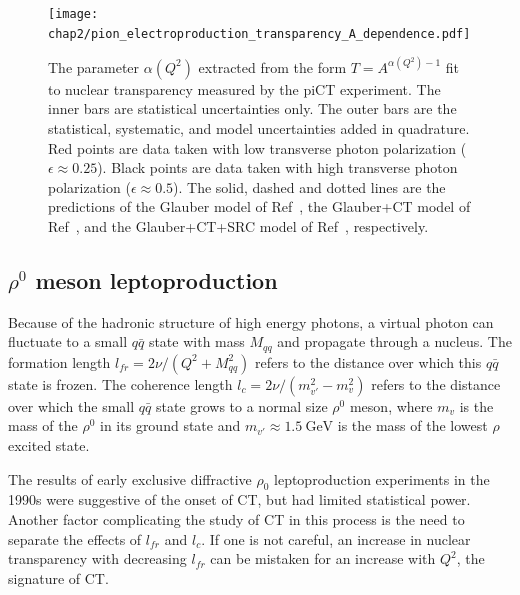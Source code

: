 \begin{figure}[!h]
    \centering
    \texttt{[image: chap2/pion\_electroproduction\_transparency\_A\_dependence.pdf]}
    \caption[The parameter $\alpha(Q^2)$ extracted from the form
            $T=A^{\alpha(Q^2)-1}$
            fit to nuclear transparency measured by the piCT experiment.]{
            The parameter $\alpha(Q^2)$ extracted from the form
            $T=A^{\alpha(Q^2)-1}$
            fit to nuclear transparency measured by the piCT experiment.
            The inner bars are statistical uncertainties only.
            The outer bars are the statistical, systematic, and model
            uncertainties added in quadrature.
            Red points are data taken with low transverse photon polarization
            ($\epsilon\approx0.25$).
            Black points are data taken with high transverse photon polarization
            ($\epsilon\approx0.5$).
            The solid, dashed and dotted lines are the predictions of
            the Glauber model of Ref~\cite{Larson_2006},
            the Glauber+CT model of Ref~\cite{Larson_2006},
            and the Glauber+CT+SRC model of Ref~\cite{Cosyn_2006},
            respectively.
            }
    \label{fig:pion_electroproduction_transparency_A_dependence}
\end{figure}

\subsection{$\rho^0$ meson leptoproduction}
Because of the hadronic structure of high energy photons,
a virtual photon can fluctuate to a small $q\bar{q}$ state with mass $M_{qq}$
and propagate through a nucleus.
The formation length $l_{fr}=2\nu/(Q^2+M^2_{qq})$ refers to the distance over
which this $q\bar{q}$ state is frozen.
The coherence length $l_c=2\nu/(m^2_{v'}-m^2_{v})$ refers to the distance over
which the small $q\bar{q}$ state grows to a normal size $\rho^0$ meson,
where $m_v$ is the mass of the $\rho^0$ in its ground state
and $m_{v'}\approx\SI{1.5}{\giga\electronvolt}$ is the mass of the lowest $\rho$
excited state.


The results of early exclusive diffractive $\rho_0$ leptoproduction
experiments in the 1990s were suggestive of the onset of CT, but had limited
statistical power.
Another factor complicating the study of CT in this process is the
need to separate the effects of $l_{fr}$ and $l_c$.
If one is not careful, an increase in nuclear transparency with decreasing
$l_{fr}$ can be mistaken for an increase with $Q^2$, the signature of CT.



